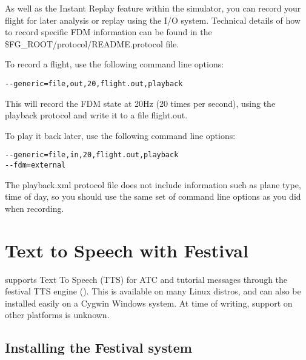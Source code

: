 As well as the Instant Replay feature within the simulator, you can record your
flight for later analysis or replay using the I/O system.  Technical details of
how to record specific FDM information can be found in the
\$FG\_ROOT/protocol/README.protocol file.

To record a flight, use the following command line options:

\begin{verbatim}
--generic=file,out,20,flight.out,playback
\end{verbatim}

This will record the FDM state at 20Hz (20 times per second), using the playback
protocol and write it to a file flight.out.

To play it back later, use the following command line options:

\begin{verbatim}
--generic=file,in,20,flight.out,playback
--fdm=external
\end{verbatim}

The playback.xml protocol file does not include information such as plane type,
time of day, so you should use the same set of command line options as you
did when recording.

\section{Text to Speech with Festival}

\FlightGear{} supports Text To Speech (TTS) for ATC and tutorial messages through the festival TTS
engine (). This is available on many Linux distros,
and can also be installed easily on a Cygwin Windows system. At time of writing, support on other platforms is unknown.

\subsection{Installing the Festival system}

